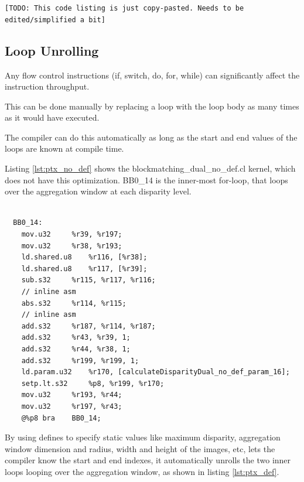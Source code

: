 \texttt{[TODO: This code listing is just copy-pasted. Needs to be
  edited/simplified a bit]}


\subsection{Loop Unrolling}

Any flow control instructions (if, switch, do, for, while) can
significantly affect the instruction throughput.


This can be done manually by replacing a loop with the loop body as
many times as it would have executed.

The compiler can do this automatically as long as the start and end
values of the loops are known at compile time.





Listing \ref{lst:ptx_no_def}  shows the blockmatching\_dual\_no\_def.cl
kernel, which does not have this optimization. BB0\_14 is the
inner-most for-loop, that loops over the aggregation window at each
disparity level.

\begin{lstlisting}[label={lst:ptx_no_def},caption=ptx assembly code for
  non-unrolling kernel]

  BB0_14:
	mov.u32 	%r39, %r197;
	mov.u32 	%r38, %r193;
	ld.shared.u8 	%r116, [%r38];
	ld.shared.u8 	%r117, [%r39];
	sub.s32 	%r115, %r117, %r116;
	// inline asm
	abs.s32 	%r114, %r115;
	// inline asm
	add.s32 	%r187, %r114, %r187;
	add.s32 	%r43, %r39, 1;
	add.s32 	%r44, %r38, 1;
	add.s32 	%r199, %r199, 1;
	ld.param.u32 	%r170, [calculateDisparityDual_no_def_param_16];
	setp.lt.s32 	%p8, %r199, %r170;
	mov.u32 	%r193, %r44;
	mov.u32 	%r197, %r43;
	@%p8 bra 	BB0_14;

\end{lstlisting}



By using defines to specify static values like maximum disparity,
aggregation window dimension and radius, width and height of the
images, etc, lets the compiler know the start and end indexes, it
automatically unrolls the two inner loops looping over the aggregation
window, as shown in listing \ref{lst:ptx_def}.


